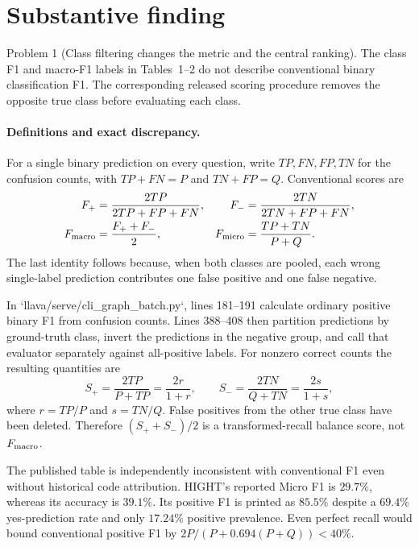 \documentclass[10pt]{article}
\begin{document}
\section*{Substantive finding}
Problem 1 (Class filtering changes the metric and the central ranking).  The class F1 and macro-F1 labels in Tables 1–2 do not describe conventional binary classification F1. The corresponding released scoring procedure removes the opposite true class before evaluating each class.\par
\paragraph*{Definitions and exact discrepancy.}\mbox{}\par
For a single binary prediction on every question, write \(TP,FN,FP,TN\) for the confusion counts, with \(TP+FN=P\) and \(TN+FP=Q\). Conventional scores are \[\begin{aligned}
 F_+&=\frac{2TP}{2TP+FP+FN},&
 F_-&=\frac{2TN}{2TN+FP+FN},\\
 F_{\rm macro}&=\frac{F_++F_-}{2},&
 F_{\rm micro}&=\frac{TP+TN}{P+Q}.\end{aligned}\] The last identity follows because, when both classes are pooled, each wrong single-label prediction contributes one false positive and one false negative.\par
In `llava/serve/cli\_graph\_batch.py`, lines 181–191 calculate ordinary positive binary F1 from confusion counts. Lines 388–408 then partition predictions by ground-truth class, invert the predictions in the negative group, and call that evaluator separately against all-positive labels. For nonzero correct counts the resulting quantities are \[S_+=\frac{2TP}{P+TP}=\frac{2r}{1+r},\qquad
 S_-=\frac{2TN}{Q+TN}=\frac{2s}{1+s},\] where \(r=TP/P\) and \(s=TN/Q\). False positives from the other true class have been deleted. Therefore \((S_++S_-)/2\) is a transformed-recall balance score, not \(F_{\rm macro}\).\par
The published table is independently inconsistent with conventional F1 even without historical code attribution. HIGHT’s reported Micro F1 is \(29.7\%\), whereas its accuracy is \(39.1\%\). Its positive F1 is printed as \(85.5\%\) despite a \(69.4\%\) yes-prediction rate and only \(17.24\%\) positive prevalence. Even perfect recall would bound conventional positive F1 by \(2P/(P+0.694(P+Q))<40\%\).\par
\end{document}
